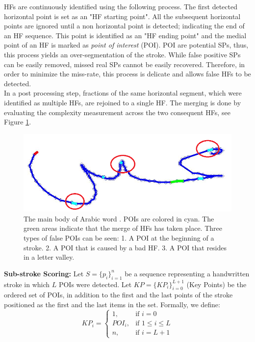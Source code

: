 \documentclass[10pt, conference, compsocconf]{IEEEtran}
\begin{document}
HFs are continuously identified using the following process.
The first detected horizontal point is set as an "HF starting point". 
All the subsequent horizontal points are ignored until a non horizontal point is detected; indicating the end of an HF sequence. 
This point is identified as an "HF ending point" and the medial point of an HF is marked as \emph{point of interest} (POI). 
POI are potential SPs, thus, this process yields an over-segmentation of the stroke. 
While false positive SPs can be easily removed, missed real SPs cannot be easily recovered. 
Therefore, in order to minimize the miss-rate, this process is delicate and allows false HFs to be detected.\\

In a post processing step, fractions of the same horizontal segment, which were identified as multiple HFs, are rejoined to a single HF. 
The merging is done by evaluating the complexity measurement across the two consequent HFs, see Figure \ref{fig:candidate_in_no_horizontal}.\\

\begin{figure}
\centering
\includegraphics[width=0.5\columnwidth]{./figures/candidate_in_no_horizontal}
\caption{The main body of Arabic word . POIs are colored in cyan. The green areas indicate that the merge of HFs has taken place. Three types of false POIs can be seen: 1. A POI at the beginning of a stroke. 2. A POI that is caused by a bad HF. 3. A POI that resides in a letter valley. }
\label{fig:candidate_in_no_horizontal}
\end{figure}

\textbf{Sub-stroke Scoring:}
Let $S=\{p_{i}\}_{i=1}^{n}$ be a sequence representing a handwritten stroke in which $L$ POIs were detected. 
Let $KP=\{KP_{i}\}_{i=0}^{L+1}$ (Key Points) be the ordered set of POIs, in addition to the first and the last points of the stroke positioned as the first and the last items in the set.
Formally, we define: 
\begin{equation}
KP_{i} =\begin{cases}    1		, & \mbox{if } i=0 \\
							   POI_{i}	, & \mbox{if } 1\leq i \leq L \\
							   n    , & \mbox{if } i=L+1 
			\end{cases}				
\end{equation}
\end{document}
